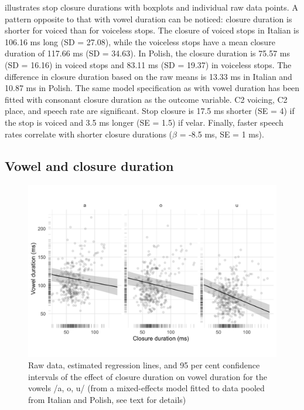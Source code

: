 \documentclass[charis]{glossa}
\begin{document}
 illustrates stop closure durations with boxplots and
individual raw data points. A pattern opposite to that with vowel
duration can be noticed: closure duration is shorter for voiced than for
voiceless stops. The closure of voiced stops in Italian is 106.16 ms
long (SD = 27.08), while the voiceless stops have a mean closure
duration of 117.66 ms (SD = 34.63). In Polish, the closure duration is
75.57 ms (SD = 16.16) in voiced stops and 83.11 ms (SD = 19.37) in
voiceless stops. The difference in closure duration based on the raw
means is 13.33 ms in Italian and 10.87 ms in Polish. The same model
specification as with vowel duration has been fitted with consonant
closure duration as the outcome variable. C2 voicing, C2 place, and
speech rate are significant. Stop closure is 17.5 ms shorter (SE = 4) if
the stop is voiced and 3.5 ms longer (SE = 1.5) if velar. Finally,
faster speech rates correlate with shorter closure durations
(\(\hat{\beta}\) = -8.5 ms, SE = 1 ms).

\hypertarget{vowel-and-closure-duration}{%
\subsection{Vowel and closure
duration}\label{vowel-and-closure-duration}}

\label{s:vcduration}

\begin{figure}
\includegraphics[width=\linewidth]{./Figure4} \caption{Raw data, estimated regression lines, and 95 per cent confidence intervals of the effect of closure duration on vowel duration for the vowels /a, o, u/ (from a mixed-effects model fitted to data pooled from Italian and Polish, see text for details)}\label{f:Figure4}
\end{figure}
\end{document}
